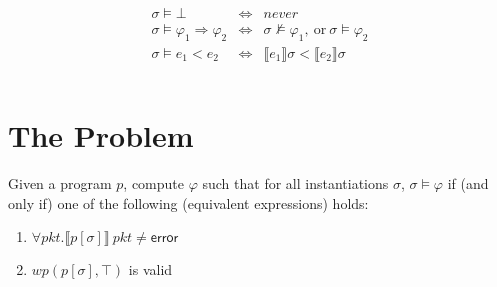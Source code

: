 \documentclass{article}
\newcommand{\NumRows}{\mathsf{numrows}}
\begin{document}
\[
  \begin{array}{rcl}
    \sigma \models \bot &\iff & \mathit{never} \\
    \sigma \models \varphi_1 \Rightarrow \varphi_2 & \iff & \sigma \not\models \varphi_1,~\text{or}~\sigma \models \varphi_2 \\
    \sigma \models e_1 < e_2 &\iff& \llbracket e_1 \rrbracket \sigma < \llbracket e_2 \rrbracket \sigma \\\\
  \end{array}
\]

\section{The Problem}

Given a program $p$, compute $\varphi$ such that for all
instantiations $\sigma$, $\sigma \models \varphi$ if (and
only if) one of the following (equivalent expressions) holds:
\begin{enumerate}
\item $\forall \mathit{pkt}. \llbracket p[\sigma]\rrbracket~\mathit{pkt} \neq \mathsf{error}$
\item $\mathit{wp}(p[\sigma], \top)$ is valid
\end{enumerate}
\end{document}
